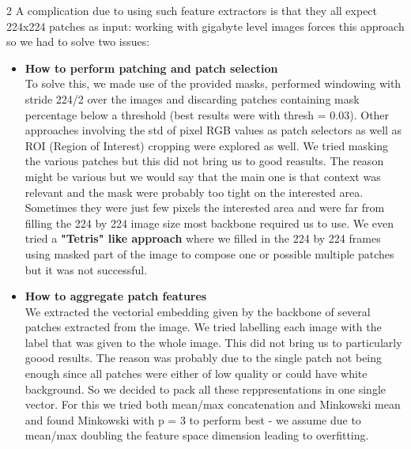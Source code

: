 \documentclass[11pt]{article}
\begin{document}
\begin{multicols}{2}
        A complication due to using such feature extractors is that they all expect 224x224 patches as input: working with gigabyte level images forces this approach so we had to solve two issues:
        \begin{itemize}
            \item \textbf{How to perform patching and patch selection}\\
            To solve this, we made use of the provided masks, performed windowing with stride {224/2} over the images and discarding patches containing mask percentage below a threshold (best results were with thresh = 0.03).
            Other approaches involving the std of pixel RGB values as patch selectors as well as ROI (Region of Interest) cropping were explored as well. We tried masking the various patches but this did not bring us to good reasults. The reason might be various but we would say that the main one is that context was relevant and the mask were probably too tight on the interested area. Sometimes they were just few pixels the interested area and were far from filling the 224 by 224 image size most backbone required us to use. We even tried a \textbf{"Tetris" like approach} where we filled in the 224 by 224 frames using masked part of the image to compose one or possible multiple patches but it was not successful.
            \item \textbf{How to aggregate patch features}\\
            We extracted the vectorial embedding given by the backbone of several patches extracted from the image. We tried labelling each image with the label that was given to the whole image. This did not bring us to particularly goood results. The reason was probably due to the single patch not being enough since all patches were either of low quality or could have white background. So we decided to pack all these reppresentations in one single vector. 
            For this we tried both mean/max concatenation and Minkowski mean and found Minkowski with p = 3 to perform best - we assume due to mean/max doubling the feature space dimension leading to overfitting.
        \end{itemize}


\end{multicols}
\end{document}
